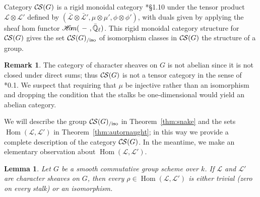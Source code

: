 \documentclass[10pt]{amsart}
\theoremstyle{plain}
\newtheorem{lemma}[theorem]{Lemma}
\theoremstyle{definition}
\newtheorem{remark}[theorem]{Remark}
\newcommand{\EE}{\mathbb{\bar Q}_\ell}
\newcommand{\bFq}{\bar{k}}
\newcommand{\Fq}{k}
\DeclareMathOperator{\Hom}{Hom}
\newcommand{\sheafHom}{{\mathscr{H}\hskip-4pt{\it o}\hskip-2pt{\it m}}}
\newcommand{\cs}[1]{{\mathcal{#1}}}
\newcommand{\gcs}[1]{{\mathcal{\bar #1}}}
\newcommand{\CS}{{\mathcal{C\hskip-0.8pt S}}}
\newcommand{\CSiso}[1]{\CS(#1)_{/\text{iso}}}
\newcommand{\bg}{{\bar{g}}}
\newcommand{\brho}{{\bar\rho}}
\begin{document}
Category $\CS(G)$ is a rigid monoidal category
\cite{etingof:09a}*{\S1.10} under the tensor product
$\cs{L} \otimes \cs{L'}$ defined by $(\gcs{L}\otimes\gcs{L'}, \mu\otimes\mu', \phi\otimes \phi')$,
with duals given by applying the sheaf hom functor
$\sheafHom(\ - \ ,\EE)$.
This rigid monoidal category structure for $\CS(G)$ gives the set $\CSiso{G}$
of isomorphism classes in $\CS(G)$ the structure of a group.

\begin{remark}
The category of character sheaves on $G$ is not abelian since it is not closed under direct sums; 
thus $\CS(G)$ is not a tensor category in the sense of \cite{deligne:02a}*{0.1}.  
We suspect that requiring that $\mu$ be injective rather than
an isomorphism and dropping the condition that the stalks be one-dimensional would yield an abelian category.
\end{remark}

We will describe the group $\CSiso{G}$ in Theorem~\ref{thm:snake}
and the sets $\Hom(\cs{L},\cs{L}')$ in Theorem~\ref{thm:autornaught}; in this way we provide a complete description of the category $\CS(G)$.
%
In the meantime, we make an elementary observation about $\Hom(\cs{L},\cs{L}')$.

\begin{lemma}\label{lem:autornaught}
Let $G$ be a smooth commutative group scheme over $\Fq$.
If $\cs{L}$ and $\cs{L}'$ are character sheaves on $G$, then
every $\rho\in \Hom(\cs{L},\cs{L}')$ is either trivial (zero on every stalk)
or an isomorphism. 
\end{lemma}

\iffalse
\begin{proof}
Suppose $\rho \in \Hom(\cs{L},\cs{L}')$.
We prove the lemma by considering the linear transformations $\brho_{\bg} : \gcs{L}_{\bg} \to \gcs{L}_{\bg}$ at the stalks
above geometric points $\bg$ on $G$ and showing that, either each $\brho_{\bg}$ trivial or each $\brho_{\bg}$ is an isomorphism.
(This idea is expanded upon in Section~\ref{ssec:stalks}.)
Let ${\bar e}$ be the geometric point above the identity $e$ for $G$ determined by our choice of algebraic closure $\bFq$ of $\Fq$.
If $\brho_{\bar e} = 0$ then the second diagram in \ref{CS.4} implies that $\brho_{\bg} = 0$ for all $\bg$, in which case $\rho$ is trivial.
On the other hand, if $\brho_{\bar e}$ is non-trivial then the second diagram in \ref{CS.4} implies that $\brho_{\bg}$ is non-trivial
for all $\bg$ and thus an isomorphism, since the stalks of character sheaves are one-dimensional; in this case $\rho$ is an isomorphism.
\end{proof}
\fi
\end{document}
